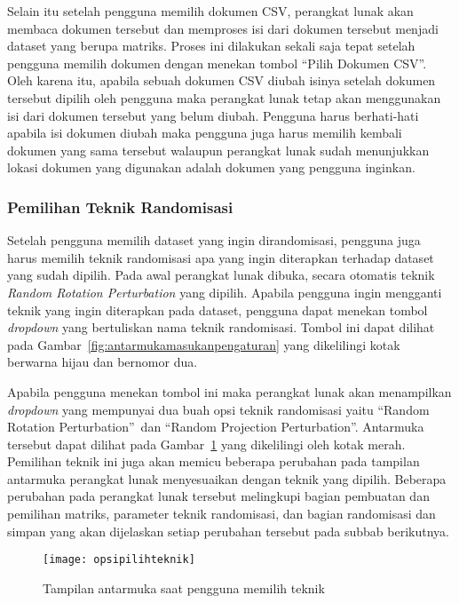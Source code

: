 Selain itu setelah pengguna memilih dokumen CSV, perangkat lunak akan membaca dokumen tersebut dan memproses isi dari dokumen tersebut menjadi dataset yang berupa matriks. Proses ini dilakukan sekali saja tepat setelah pengguna memilih dokumen dengan menekan tombol \textquotedblleft Pilih Dokumen CSV\textquotedblright. Oleh karena itu, apabila sebuah dokumen CSV diubah isinya setelah dokumen tersebut dipilih oleh pengguna maka perangkat lunak tetap akan menggunakan isi dari dokumen tersebut yang belum diubah. Pengguna harus berhati-hati apabila isi dokumen diubah maka pengguna juga harus memilih kembali dokumen yang sama tersebut walaupun perangkat lunak sudah menunjukkan lokasi dokumen yang digunakan adalah dokumen yang pengguna inginkan.

\subsubsection{Pemilihan Teknik Randomisasi}
\label{subsubsec:pilihteknik}

Setelah pengguna memilih dataset yang ingin dirandomisasi, pengguna juga harus memilih teknik randomisasi apa yang ingin diterapkan terhadap dataset yang sudah dipilih. Pada awal perangkat lunak dibuka, secara otomatis teknik \textit{Random Rotation Perturbation} yang dipilih. Apabila pengguna ingin mengganti teknik yang ingin diterapkan pada dataset, pengguna dapat menekan tombol \textit{dropdown} yang bertuliskan nama teknik randomisasi. Tombol ini dapat dilihat pada Gambar~\ref{fig:antarmukamasukanpengaturan} yang dikelilingi kotak berwarna hijau dan bernomor dua.

Apabila pengguna menekan tombol ini maka perangkat lunak akan menampilkan \textit{dropdown} yang mempunyai dua buah opsi teknik randomisasi yaitu \textquotedblleft Random Rotation Perturbation\textquotedblright~dan \textquotedblleft Random Projection Perturbation\textquotedblright. Antarmuka tersebut dapat dilihat pada Gambar~\ref{fig:opsipilihteknik} yang dikelilingi oleh kotak merah. Pemilihan teknik ini juga akan memicu beberapa perubahan pada tampilan antarmuka perangkat lunak menyesuaikan dengan teknik yang dipilih. Beberapa perubahan pada perangkat lunak tersebut melingkupi bagian pembuatan dan pemilihan matriks, parameter teknik randomisasi, dan bagian randomisasi dan simpan yang akan dijelaskan setiap perubahan tersebut pada subbab berikutnya.

\begin{figure}
	\centering
	\texttt{[image: opsipilihteknik]}
	\caption{Tampilan antarmuka saat pengguna memilih teknik}
	\label{fig:opsipilihteknik}
\end{figure}


